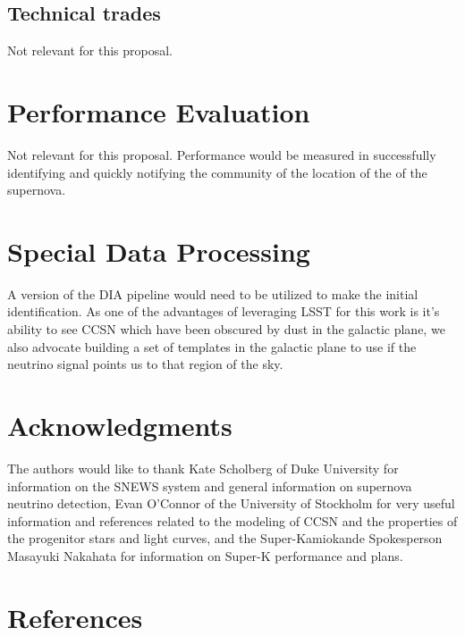 \documentclass[11pt, letterpaper]{article}
\begin{document}
\subsection{Technical trades}

Not relevant for this proposal.

\section{Performance Evaluation}

Not relevant for this proposal.  Performance would be measured in successfully
identifying and quickly notifying the community of the location of the
of the supernova.

\section{Special Data Processing}

A version of the DIA pipeline would need to be utilized to make the
initial identification.  As one of the advantages of leveraging LSST
for this work is it's ability to see CCSN which have been obscured by
dust in the galactic plane, we also advocate building a set of
templates in the galactic plane to use if the neutrino signal points
us to that region of the sky.

\section{Acknowledgments}

The authors would like to thank Kate Scholberg of Duke University for
information on the SNEWS system and general information on supernova
neutrino detection, Evan O'Connor of the University of Stockholm for
very useful information and references related to the modeling of CCSN
and the properties of the progenitor stars and light curves, and the
Super-Kamiokande Spokesperson Masayuki Nakahata for information on
Super-K performance and plans.

\section{References}

 

\end{document}
